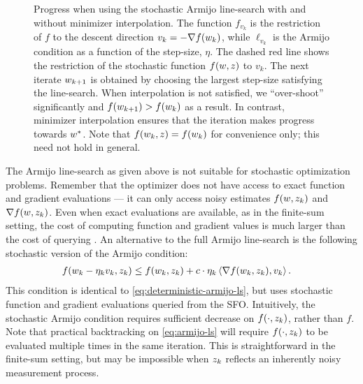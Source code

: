 \begin{figure}[t]
    \centering
    
    \caption[Progress made by stochastic gradient descent when using the stochastic Armijo line-search with and without minimizer interpolation.]%
       {Progress when using the stochastic Armijo line-search with and without minimizer interpolation.
        The function \( f_{v_k} \) is the restriction of \( f \) to the descent direction \( v_k = -\nabla f(w_k) \), while \( \ell_{v_k} \) is the Armijo condition as a function of the step-size, \( \eta \).
        The dashed red line shows the restriction of the stochastic function \( f(w, z) \) to \( v_k \).
        The next iterate \( w_{k+1} \) is obtained by choosing the largest step-size satisfying the line-search. 
        When interpolation is not satisfied, we ``over-shoot'' significantly and \( f(w_{k+1}) > f(w_k) \) as a result.
        In contrast, minimizer interpolation ensures that the iteration makes progress towards \( w^* \). 
        Note that \( f(w_k,z) = f(w_k) \) for convenience only; this need not hold in general. 
    }%
    \label{fig:interpolation-ls}
\end{figure}

The Armijo line-search as given above is not suitable for stochastic optimization problems.
Remember that the optimizer does not have access to exact function and gradient evaluations --- it can only access noisy estimates \( f(w, z_{k}) \) and \( \nabla f(w, z_{k}) \).
Even when exact evaluations are available, as in the finite-sum setting, the cost of computing function and gradient values is much larger than the cost of querying \oracle{}. 
An alternative to the full Armijo line-search is the following stochastic version of the Armijo condition:
\begin{align}
    f(w_k - \eta_k v_k, z_{k}) &\leq f(w_k, z_{k}) + c \cdot \eta_k \left\langle\nabla f(w_k, z_{k}), v_k\right\rangle. \label{eq:armijo-ls}
\end{align}
This condition is identical to \autoref{eq:deterministic-armijo-ls}, but uses stochastic function and gradient evaluations queried from the \ac{SFO}.
Intuitively, the stochastic Armijo condition requires sufficient decrease on \( f(\cdot, z_{k}) \), rather than \( f \).
Note that practical backtracking on \autoref{eq:armijo-ls} will require \( f(\cdot, z_{k}) \) to be evaluated multiple times in the same iteration.
This is straightforward in the finite-sum setting, but may be impossible when \( z_{k} \) reflects an inherently noisy measurement process. 

